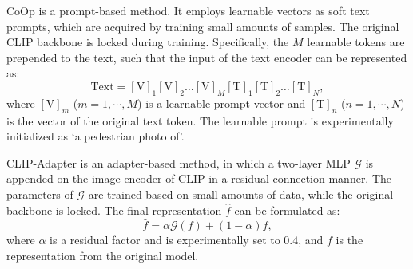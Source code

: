 \documentclass[letterpaper]{article} %
\begin{document}

CoOp is a prompt-based method. It employs learnable vectors as soft text prompts, which are acquired by training small amounts of samples.
The original CLIP backbone is locked during training.
Specifically, the $M$ learnable tokens are prepended to the text, such that the input of the text encoder can be represented as:
\begin{equation}
    \text{Text} = [\text{V}]_1 [\text{V}]_2 \hdots [\text{V}]_M [\text{T}]_1 [\text{T}]_2 \hdots [\text{T}]_N,
\end{equation}
where $[\text{V}]_m$ ($m=1, \cdots, M$) is a learnable prompt vector and $[\text{T}]_n$ ($n=1, \cdots, N$) is the vector of the original text token.
The learnable prompt is experimentally initialized as `a pedestrian photo of'.


CLIP-Adapter is an adapter-based method, in which a two-layer MLP $\mathcal{G}$ is appended on the image encoder of CLIP in a residual connection manner.
The parameters of $\mathcal{G}$ are trained based on small amounts of data, while the original backbone is locked.
The final representation $\hat{f}$ can be formulated as:
\begin{equation}
    \hat{f} = \alpha \mathcal{G}(f) + (1 - \alpha) f,
\end{equation}
where $\alpha$ is a residual factor and is experimentally set to $0.4$, and $f$ is the representation from the original model.
\end{document}

